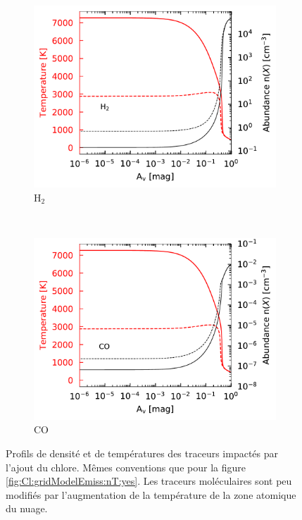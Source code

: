 \begin{appendices}
\begin{figure}[!h]
    \begin{subfigure}[t]{0.49\textwidth} %
        \centering \includegraphics[trim = {0 0 0 0},clip,width=1\textwidth]{figure/Cl/gridModelEmiss/nT_comp_H2.pdf}
        \caption{$\mathrm{H}_2$}
    \end{subfigure}
    ~ 
    \begin{subfigure}[t]{0.49\textwidth} %
        \centering \includegraphics[trim = {0 0 0 0},clip,width=1\textwidth]{figure/Cl/gridModelEmiss/nT_comp_CO.pdf}
        \caption{$\mathrm{CO}$}
    \end{subfigure}
    
    \caption{Profils de densité et de températures des traceurs impactés par l'ajout du chlore. Mêmes conventions que pour la figure \ref{fig:Cl:gridModelEmiss:nT:yes}. Les traceurs moléculaires sont peu modifiés par l'augmentation de la température de la zone atomique du nuage. }
    \label{fig:Cl:gridModelEmiss:nT:no}
\end{figure}



\end{appendices}
